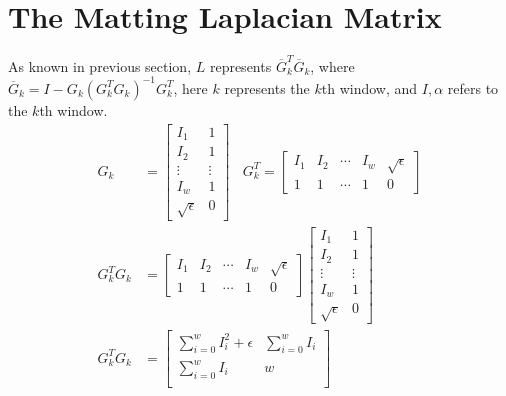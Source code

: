 \documentclass[journal]{IEEEtran}
\begin{document}
\section{The Matting Laplacian Matrix}
\label{laplacian_derivation}
As known in previous section, $L$ represents $\overline{G}^{T}_{k}\overline{G}_{k}$, where $\overline{G}_{k} = I - G_{k}(G_{k}^{T}G_{k})^{-1}G_{k}^{T}$, here $k$ represents the $k$th window, and $I, \alpha$ refers to the $k$th window. 
\begin{equation}
    \begin{aligned}
        G_k &= \begin{bmatrix}
                I_1 & 1 \\ I_2 & 1 \\ \vdots & \vdots \\
                I_w & 1 \\ \sqrt{\epsilon} & 0
             \end{bmatrix}
    ~~~~G_{k}^{T} = \begin{bmatrix}
                        I_1 & I_2 & \cdots & I_w & \sqrt{\epsilon} \\
                        1 & 1 & \cdots & 1 & 0
                    \end{bmatrix} \\
        G_k^T G_k &= \begin{bmatrix}
                        I_1 & I_2 & \cdots & I_w & \sqrt{\epsilon} \\
                        1 & 1 & \cdots & 1 & 0
                    \end{bmatrix} 
                    \begin{bmatrix}
                        I_1 & 1 \\ I_2 & 1 \\ \vdots & \vdots \\
                        I_w & 1 \\ \sqrt{\epsilon} & 0
                    \end{bmatrix} \\
         G_k^T G_k &= \begin{bmatrix}
                        \sum\limits_{i=0}^{w}I_i^2+\epsilon & \sum\limits_{i=0}^{w}I_i \\
                        \sum\limits_{i=0}^{w}I_i & w \\
                      \end{bmatrix}
    \end{aligned}
    \label{equ20}
\end{equation}
\end{document}
